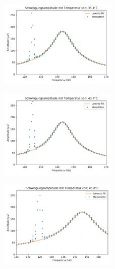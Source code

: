 \documentclass{article}
\begin{document}
\begin{figure}
\centering
\includegraphics[width=0.5\textwidth]{Resonanz140_temp9.pdf}
\end{figure}
\begin{figure}
\centering
\includegraphics[width=0.5\textwidth]{Resonanz140_temp10.pdf}
\end{figure}
\begin{figure}
\centering
\includegraphics[width=0.5\textwidth]{Resonanz140_temp11.pdf}
\end{figure}
\end{document}
